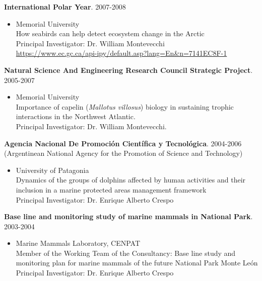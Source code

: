 \documentclass{res}
\begin{document}
\begin{resume}
\textbf{International Polar Year}. 2007-2008
\begin{itemize} %
	\item[] Memorial University\\
How seabirds can help detect ecosystem change in the Arctic\\
Principal Investigator: Dr. William Montevecchi\\
\url{https://www.ec.gc.ca/api-ipy/default.asp?lang=En&n=7141EC8F-1}
\end{itemize}

\textbf{Natural Science And Engineering Research Council Strategic Project}. 2005-2007
\begin{itemize} %
	\item[] Memorial University\\
Importance of capelin (\textit{Mallotus villosus}) biology in sustaining trophic interactions in the Northwest Atlantic. \\
Principal Investigator: Dr. William Montevecchi.
\end{itemize}

\textbf{Agencia Nacional De Promoci\'{o}n Cient\'{i}fica y Tecnol\'{o}gica}. 2004-2006\\
(Argentinean National Agency for the Promotion of Science and Technology)
\begin{itemize} %
	\item[] University of Patagonia\\
Dynamics of the groups of dolphins affected by human activities and their inclusion in a marine protected areas management framework\\ 
Principal Investigator: Dr. Enrique Alberto Crespo
\end{itemize}

\textbf{Base line and monitoring study of marine mammals in National Park}. 2003-2004
\begin{itemize} %
	\item[] Marine Mammals Laboratory, CENPAT\\
Member of the Working Team of the Consultancy: Base line study and monitoring plan for marine mammals of the future National Park Monte Le\'{o}n\\
Principal Investigator: Dr. Enrique Alberto Crespo
\end{itemize}


\end{resume}
\end{document}
